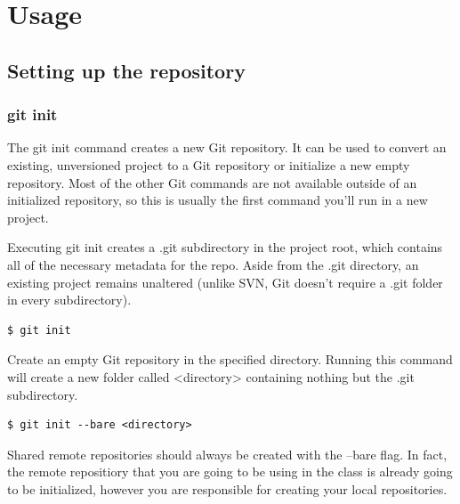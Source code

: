 \documentclass{article}
\begin{document}

\section{Usage}

\subsection{Setting up the repository}

\subsubsection*{git init}

The git init command creates a new Git repository. It can be used to
convert an existing, unversioned project to a Git repository or
initialize a new empty repository. Most of the other Git commands are
not available outside of an initialized repository, so this is usually
the first command you'll run in a new project. 

Executing git init creates a .git subdirectory in the project root,
which contains all of the necessary metadata for the repo. Aside from
the .git directory, an existing project remains unaltered (unlike SVN,
Git doesn't require a .git folder in every subdirectory). 

\begin{lstlisting}
$ git init
\end{lstlisting}

Create an empty Git repository in the specified directory. Running
this command will create a new folder called <directory> containing
nothing but the .git subdirectory.

\begin{lstlisting}
$ git init --bare <directory>
\end{lstlisting}

Shared remote repositories should always be created with the --bare
flag. In fact, the remote repositiory that you are going to be using in the
class is already going to be initialized, however you are responsible
for creating your local repositories.
\end{document}
